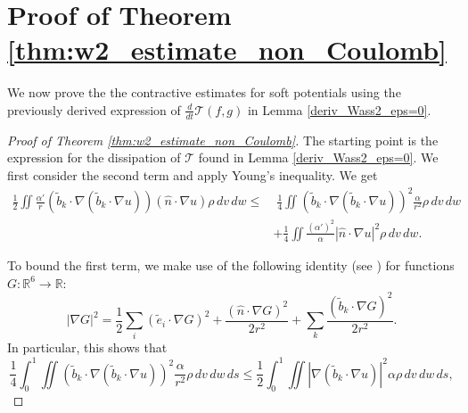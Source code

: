 \documentclass[11pt]{amsart}
\numberwithin{equation}{section}
\begin{document}
\section{Proof of Theorem \ref{thm:w2_estimate_non_Coulomb}}\label{sec:proof_w2_estimate_non_Coulomb}
We now prove the the contractive estimates for soft potentials using the previously derived expression of $\frac{d}{dt}\mathcal T(f,g)$ in Lemma \ref{deriv_Wass2_eps=0}.

\begin{proof}[Proof of Theorem \ref{thm:w2_estimate_non_Coulomb}]
The starting point is the expression for the dissipation of  $\mathcal{T}$ found in Lemma \ref{deriv_Wass2_eps=0}. 
We first consider the second term and apply Young's inequality. We get %
\begin{align*}
  \frac{1}{2}\iint\frac{\alpha'}{r}\left(\tilde{b}_{k}\cdot\nabla\left(\tilde{b}_{k}\cdot\nabla u\right)\right)\left(\hat{n}\cdot\nabla u\right)\rho\,dv\,dw 
  \le &  \; \frac{1}{4}\iint\left(\tilde{b}_{k}\cdot\nabla\left(\tilde{b}_{k}\cdot\nabla u\right)\right)^{2}\frac{\alpha}{r^{2}}\rho\,dv\,dw	\\
  &+\frac{1}{4}\iint\frac{(\alpha')^2}{\alpha}\left|\hat n \cdot\nabla u\right|^{2}\rho\,dv\,dw.
\end{align*}


To bound the first term, we make use of the following identity (see \cite{GS24}) for functions ${G:\mathbb{R}^6\longrightarrow \mathbb{R}}$:
%
\begin{equation*}
  \left|\nabla G\right|^{2}=\frac{1}{2}\sum_{i}\left(\tilde{e}_{i}\cdot\nabla G\right)^{2}+\frac{\left(\hat{n}\cdot\nabla G\right)^{2}}{2r^{2}}+\sum_{k}\frac{\left(\tilde{b}_{k}\cdot\nabla G\right)^{2}}{2r^{2}}.
\end{equation*}
%
In particular, this shows that
%
\begin{equation*}
  \frac{1}{4}\int_{0}^{1}\iint\left(\tilde{b}_{k}\cdot\nabla\left(\tilde{b}_{k}\cdot\nabla u\right)\right)^{2}\frac{\alpha}{r^{2}}\rho\,dv\,dw\,ds\leq \frac{1}{2}\int_{0}^{1}\iint\left|\nabla\left(\tilde{b}_{k}\cdot\nabla u\right)\right|^{2}\alpha\rho\,dv\,dw\,ds,
\end{equation*}


\end{proof}
\end{document}
